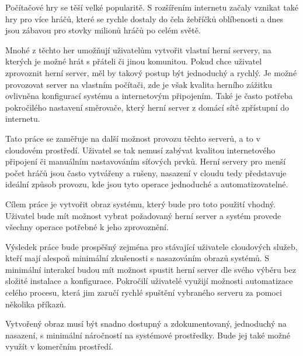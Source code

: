 \begin{introduction}

Počítačové hry se těší velké popularitě. S rozšířením internetu začaly vznikat také hry
pro více hráčů, které se rychle dostaly do čela žebříčků oblíbenosti a dnes jsou zábavou pro stovky milionů
hráčů po celém světě.

Mnohé z těchto her umožňují uživatelům vytvořit vlastní herní servery, na kterých je možné hrát s přáteli
či jinou komunitou.
Pokud chce uživatel zprovoznit herní server, měl by takový postup být jednoduchý a rychlý.
Je možné provozovat server na vlastním počítači, zde je však kvalita herního zážitku 
ovlivněna konfigurací systému a internetovým připojením. Také je často potřeba pokročilého nastavení
směrovače, který herní server z domácí sítě zpřístupní do internetu.

Tato práce se zaměřuje na další možnost provozu těchto serverů, a to v cloudovém prostředí. Uživatel se tak nemusí zabývat 
kvalitou internetového připojení či manuálním nastavováním síťových prvků. Herní servery
pro menší počet hráčů jsou často vytvářeny a rušeny, nasazení v cloudu tedy představuje ideální způsob provozu,
kde jsou tyto operace jednoduché a automatizovatelné.

Cílem práce je vytvořit obraz systému, který bude pro toto použití vhodný. Uživatel bude mít možnost vybrat
požadovaný herní server a systém provede všechny operace potřebné k jeho zprovoznění.

Výsledek práce bude prospěšný zejména pro stávající uživatele cloudových služeb, kteří mají alespoň minimální
zkušenosti s nasazováním obrazů systémů. S minimální interakcí budou mít možnost spustit herní server dle svého
výběru bez složité instalace a konfigurace. Pokročilí uživatelé využijí možnosti automatizace celého procesu,
která jim zaručí rychlé spuštění vybraného serveru za pomoci několika příkazů.

Vytvořený obraz musí být snadno dostupný a zdokumentovaný, jednoduchý na nasazení, s minimální náročností 
na systémové prostředky. Bude jej také možné využít v komerčním prostředí.

\end{introduction}